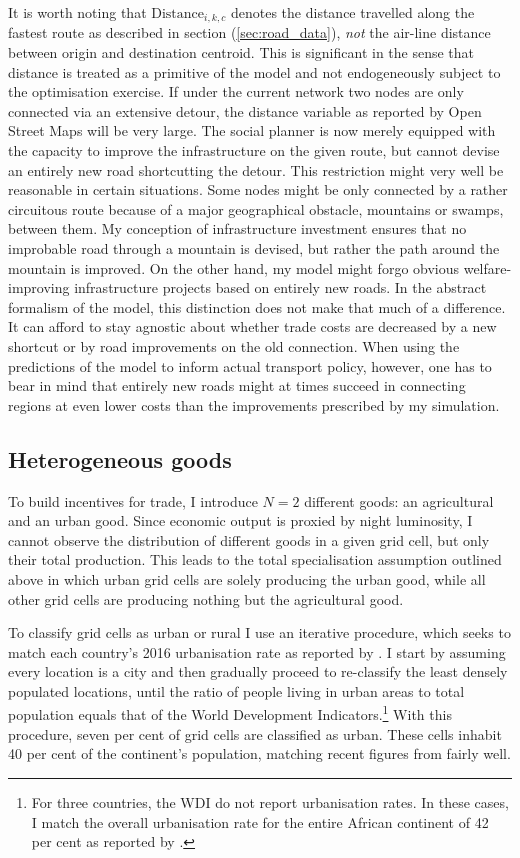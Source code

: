 \documentclass[11pt, oneside]{article}   	%
\let\oldref\ref
\renewcommand{\ref}[1]{(\oldref{#1})}
\begin{document}
It is worth noting that $\textrm{Distance}_{i,k,c}$ denotes the distance travelled along the fastest route as described in section \ref{sec:road_data}, \emph{not} the air-line distance between origin and destination centroid. This is significant in the sense that distance is treated as a primitive of the model and not endogeneously subject to the optimisation exercise. If under the current network two nodes are only connected via an extensive detour, the distance variable as reported by Open Street Maps will be very large. The social planner is now merely equipped with the capacity to improve the infrastructure on the given route, but cannot devise an entirely new road shortcutting the detour. This restriction might very well be reasonable in certain situations. Some nodes might be only connected by a rather circuitous route because of a major geographical obstacle, mountains or swamps, between them. My conception of infrastructure investment ensures that no improbable road through a mountain is devised, but rather the path around the mountain is improved. On the other hand, my model might forgo obvious welfare-improving infrastructure projects based on entirely new roads. In the abstract formalism of the model, this distinction does not make that much of a difference. It can afford to stay agnostic about whether trade costs are decreased by a new shortcut or by road improvements on the old connection. When using the predictions of the model to  inform actual transport policy, however, one has to bear in mind that entirely new roads might at times succeed in connecting regions at even lower costs than the improvements prescribed by my simulation.

\subsection{Heterogeneous goods}
To build incentives for trade, I introduce $N=2$ different goods: an agricultural and an urban good. Since economic output is proxied by night luminosity, I cannot observe the distribution of different goods in a given grid cell, but only their total production. This leads to the total specialisation assumption outlined above in which urban grid cells are solely producing the urban good, while all other grid cells are producing nothing but the agricultural good.

To classify grid cells as urban or rural I use an iterative procedure, which seeks to match each country's 2016 urbanisation rate as reported by \cite{the_world_bank_world_2017}. I start by assuming every location is a city and then gradually proceed to re-classify the least densely populated locations, until the ratio of people living in urban areas to total population equals that of the World Development Indicators.\footnote{For three countries, the WDI do not report urbanisation rates. In these cases, I match the overall urbanisation rate for the entire African continent of 42 per cent as reported by \cite{lall_africas_2017}.} With this procedure, seven per cent of grid cells are classified as urban. These cells inhabit 40 per cent of the continent's population, matching recent figures from \cite{lall_africas_2017} fairly well.
\end{document}
